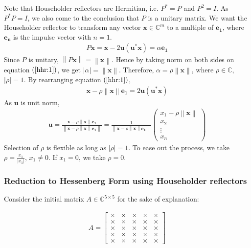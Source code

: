\documentclass[12pt]{article}
\numberwithin{equation}{section}
\newcommand{\vecb}[1]{\mathbf{#1}}
\newcommand{\brak}[1]{\ensuremath{\left(#1\right)}}
\newcommand{\defmat}[2]{#1\in\mathbb{C}^{#2\times#2}}
\newcommand{\defvec}[2]{\vecb{#1}\in\mathbb{C}^{#2}}
\newcommand{\abs}[1]{\left\vert#1\right\vert}
\newcommand{\norm}[1]{\left\lVert#1\right\rVert}
\begin{document}
Note that Householder reflectors are Hermitian, i.e. $P^{\ast} = P$ and $P^2 = I$. As $P^{\ast}P = I$, we also come to the conclusion
that $P$ is a unitary matrix.
\newline
We want the Householder reflector to transform any vector $\defvec{x}{m}$ to a multiple of $\vecb{e_1}$, where $\vecb{e_n}$ is the impulse vector with $n = 1$.
\begin{align}
\label{hhr:1}
    P\vecb{x} = \vecb{x} - 2\vecb{u}\brak{\vecb{u^{\ast}}\vecb{x}} = \alpha \vecb{e_1}
\end{align}
Since $P$ is unitary, $\norm{P\vecb{x}} = \norm{\vecb{x}}$.
\newline
Hence by taking norm on both sides on equation \brak{\ref{hhr:1}}, we get $\abs{\alpha} = \norm{\vecb{x}}$. Therefore, $\alpha = \rho\norm{\vecb{x}}$, where $\rho \in \mathbb{C}$, $\abs{\rho} = 1$. 
\newline
By rearranging equation \brak{\ref{hhr:1}},
\begin{align}
    \vecb{x} - \rho\norm{\vecb{x}}\vecb{e_1} = 2\vecb{u}\brak{\vecb{u^{\ast}}\vecb{x}}
\end{align}
As $\vecb{u}$ is unit norm,
\begin{align}
\label{hhr:2}
    \vecb{u} = \frac{\vecb{x} - \rho\norm{\vecb{x}}\vecb{e_1}}{\norm{\vecb{x} - \rho\norm{\vecb{x}}\vecb{e_1}}} = \frac{1}{\norm{\vecb{x} - \rho\norm{\vecb{x}}\vecb{e_1}}} \begin{pmatrix} x_1 - \rho\norm{\vecb{x}}\\x_2\\\vdots\\x_n\end{pmatrix}
\end{align}
Selection of $\rho$ is flexible as long as $\abs{\rho} = 1$. To ease out the process, we take $\rho = \frac{x_1}{\abs{x_1}}$, $x_1 \neq 0$. If $x_1 = 0$, we take $\rho = 0$.

\subsubsection{Reduction to Hessenberg Form using Householder reflectors}
Consider the initial matrix $\defmat{A}{5}$ for the sake of explanation:

\begin{align}
A = \begin{bmatrix}
\times & \times & \times & \times & \times\\
\times & \times & \times & \times & \times\\
\times & \times & \times & \times & \times\\
\times & \times & \times & \times & \times\\
\times & \times & \times & \times & \times
\end{bmatrix}
\end{align}
\end{document}
